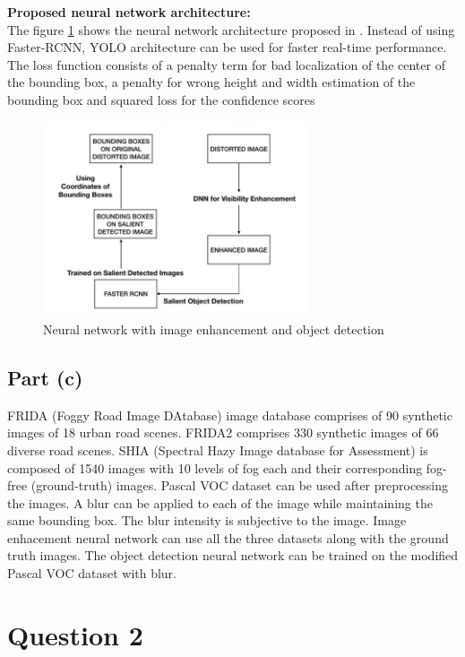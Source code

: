 \documentclass[twosided]{article}
\begin{document}
\textbf{Proposed neural network architecture:}\\
The figure \ref{fig:figure3} shows the neural network architecture proposed in \cite{Salient}. Instead of using Faster-RCNN, YOLO architecture can be used for faster real-time performance. The loss function consists of a penalty term for bad localization of the center of the bounding box, a penalty for wrong height and width estimation of the bounding box and squared loss for the confidence scores

\begin{figure}[h]
    \centering
    \includegraphics[width=0.7\textwidth]{images/Figure3.png}
    \caption{Neural network with image enhancement and object detection}
    \label{fig:figure3}
\end{figure}

\subsection{Part (c)}
FRIDA (Foggy Road Image DAtabase) image database comprises of 90 synthetic images of 18 urban road scenes. FRIDA2 comprises 330 synthetic images of 66 diverse road scenes. SHIA (Spectral Hazy Image database for Assessment) is composed of 1540 images with 10 levels of fog each and their corresponding fog-free (ground-truth) images. Pascal VOC dataset can be used after preprocessing the images. A blur can be applied to each of the image while maintaining the same bounding box. The blur intensity is subjective to the image. Image enhacement neural network can use all the three datasets along with the ground truth images. The object detection neural network can be trained on the modified Pascal VOC dataset with blur. 

\section{Question 2}
\end{document}
